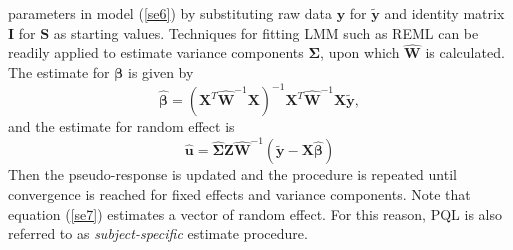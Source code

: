 parameters in model (\ref{se6}) by substituting raw data $\bm y$ for $\tilde{\bm y}$  and identity
matrix $\bm I$ for $\bm S$ as starting values. Techniques for fitting LMM such as REML can be
readily applied to estimate variance components $\bm \Sigma$, upon which $\hat{\bm W}$ is
calculated. The estimate for $\bm \beta$ is given by
\begin{equation}
	\hat{\bm\beta} = (\bm X^T\hat{\bm W}^{-1} \bm X)^{-1}\bm X^T\hat{\bm W}^{-1}\bm X \tilde{\bm y},
\end{equation}
and the estimate for random effect is 
\begin{equation}\label{se7}
	\hat{\bm u} = \hat{\bm\Sigma } \bm Z \hat{\bm W}^{-1} (\tilde{\bm y}-\bm {X} \hat{\bm \beta})
\end{equation}
Then the pseudo-response is updated and the procedure is repeated until convergence is reached for
fixed effects and variance components.  Note that equation (\ref{se7}) estimates a vector of random
effect. For this reason, PQL is also referred to as \textit{subject-specific} estimate procedure. 

